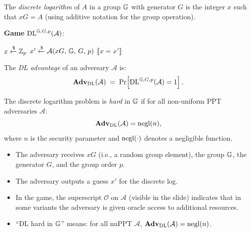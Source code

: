 \documentclass[11pt]{article}
\begin{document}
The \emph{discrete logarithm} of $A$ in a group $\mathbb{G}$ with generator $G$ is the
integer $x$ such that $xG = A$ (using additive notation for the group operation).

\begin{tcolorbox}[colback=gray!10!white, colframe=gray!60!black,
  title=Discrete Logarithm (DL) Security Game]
\textbf{Game} $\mathrm{DL}^{\mathbb{G},G,p}(\mathcal{A})$:

\medskip
\begin{algorithmic}[1]
  \State $x \xleftarrow{\$} \mathbb{Z}_p$ 
  \State $x' \xleftarrow{\$} \mathcal{A}(xG,\, \mathbb{G},\, G,\, p)$
  \State \Return $\llbracket x = x' \rrbracket$
\end{algorithmic}
\end{tcolorbox}

\begin{definition}[DL Advantage]
The \emph{DL advantage} of an adversary $\mathcal{A}$ is:
\[
  \mathbf{Adv}_{\mathrm{DL}}(\mathcal{A})
  \;=\;
  \Pr\!\left[\mathrm{DL}^{\mathbb{G},G,p}(\mathcal{A}) = 1\right].
\]
\end{definition}

\begin{definition}[DL-hardness]
The discrete logarithm problem is \emph{hard} in $\mathbb{G}$ if for all
non-uniform PPT adversaries $\mathcal{A}$:
\[
  \mathbf{Adv}_{\mathrm{DL}}(\mathcal{A}) = \operatorname{negl}(n),
\]
where $n$ is the security parameter and $\operatorname{negl}(\cdot)$ denotes a negligible function.
\end{definition}

\begin{remark}
\hfill
\begin{itemize}
  \item The adversary receives $xG$ (i.e., a random group element), the group $\mathbb{G}$,
        the generator $G$, and the group order $p$.
  \item The adversary outputs a guess $x'$ for the discrete log.
  \item In the game, the superscript $\mathcal{O}$ on $\mathcal{A}$ (visible in the slide)
        indicates that in some variants the adversary is given oracle access to additional
        resources.
  \item ``DL hard in $\mathbb{G}$'' means: for all nuPPT $\mathcal{A}$,
        $\mathbf{Adv}_{\mathrm{DL}}(\mathcal{A}) = \operatorname{negl}(n)$.
\end{itemize}
\end{remark}
\end{document}
